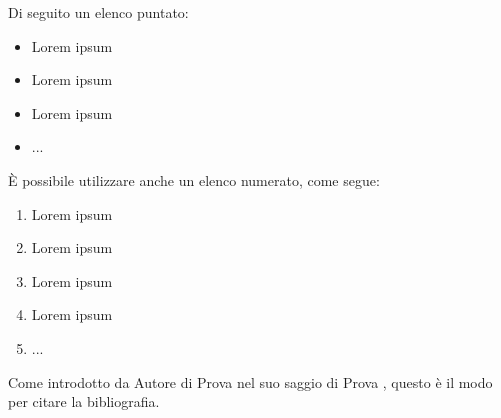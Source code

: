Di seguito un elenco puntato:
\begin{itemize}
    \item Lorem ipsum
    \item Lorem ipsum
    \item Lorem ipsum
    \item ...
\end{itemize}

È possibile utilizzare anche un elenco numerato, come segue:
\begin{enumerate}
    \item Lorem ipsum
    \item Lorem ipsum
    \item Lorem ipsum
    \item Lorem ipsum
    \item ...
\end{enumerate}\vspace{12pt}

Come introdotto da Autore di Prova nel suo saggio di Prova \cite{articolo_prova}, questo è il modo per citare la bibliografia.